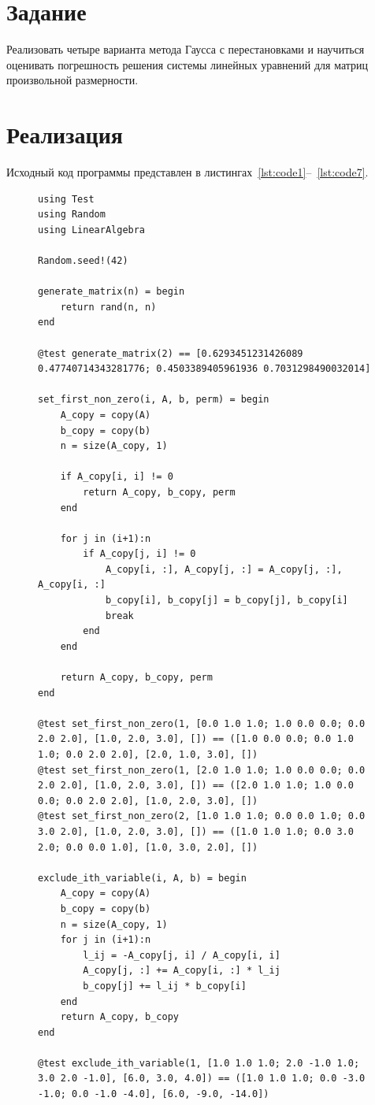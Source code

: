 \documentclass[a4paper, 14pt]{extarticle}
\begin{document}
\renewcommand{\ttdefault}{pcr}

\setlength{\tabcolsep}{3pt}
\newpage
\setcounter{page}{2}

\section{Задание}\label{Sect::task}

Реализовать четыре варианта метода Гаусса с перестановками и научиться оценивать
погрешность решения системы линейных уравнений для матриц произвольной
размерности.

\section{Реализация}\label{Sect::impl}

Исходный код программы представлен в листингах~\ref{lst:code1}--~\ref{lst:code7}.

\begin{figure}[!htb]
\begin{lstlisting}[language={},caption={Метод Гаусса},label={lst:code1}]
using Test
using Random
using LinearAlgebra

Random.seed!(42)

generate_matrix(n) = begin
    return rand(n, n)
end

@test generate_matrix(2) == [0.6293451231426089 0.47740714343281776; 0.4503389405961936 0.7031298490032014]

set_first_non_zero(i, A, b, perm) = begin
    A_copy = copy(A)
    b_copy = copy(b)
    n = size(A_copy, 1)

    if A_copy[i, i] != 0
        return A_copy, b_copy, perm
    end

    for j in (i+1):n
        if A_copy[j, i] != 0
            A_copy[i, :], A_copy[j, :] = A_copy[j, :], A_copy[i, :]
            b_copy[i], b_copy[j] = b_copy[j], b_copy[i]
            break
        end
    end

    return A_copy, b_copy, perm
end

@test set_first_non_zero(1, [0.0 1.0 1.0; 1.0 0.0 0.0; 0.0 2.0 2.0], [1.0, 2.0, 3.0], []) == ([1.0 0.0 0.0; 0.0 1.0 1.0; 0.0 2.0 2.0], [2.0, 1.0, 3.0], [])
@test set_first_non_zero(1, [2.0 1.0 1.0; 1.0 0.0 0.0; 0.0 2.0 2.0], [1.0, 2.0, 3.0], []) == ([2.0 1.0 1.0; 1.0 0.0 0.0; 0.0 2.0 2.0], [1.0, 2.0, 3.0], [])
@test set_first_non_zero(2, [1.0 1.0 1.0; 0.0 0.0 1.0; 0.0 3.0 2.0], [1.0, 2.0, 3.0], []) == ([1.0 1.0 1.0; 0.0 3.0 2.0; 0.0 0.0 1.0], [1.0, 3.0, 2.0], [])

exclude_ith_variable(i, A, b) = begin
    A_copy = copy(A)
    b_copy = copy(b)
    n = size(A_copy, 1)
    for j in (i+1):n
        l_ij = -A_copy[j, i] / A_copy[i, i]
        A_copy[j, :] += A_copy[i, :] * l_ij
        b_copy[j] += l_ij * b_copy[i]
    end
    return A_copy, b_copy
end

@test exclude_ith_variable(1, [1.0 1.0 1.0; 2.0 -1.0 1.0; 3.0 2.0 -1.0], [6.0, 3.0, 4.0]) == ([1.0 1.0 1.0; 0.0 -3.0 -1.0; 0.0 -1.0 -4.0], [6.0, -9.0, -14.0])
\end{lstlisting}
\end{figure}
\end{document}
